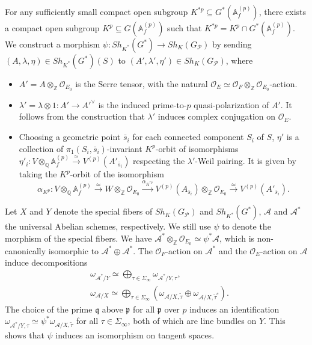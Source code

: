 \documentclass{article}
\begin{document}
For any sufficiently small compact open subgroup $K^{\ast p}\subseteq G^\ast(\mathbb{A}_f^{(p)})$, there exists a compact open subgroup $K^p\subseteq G(\mathbb{A}_f^{(p)})$ such that $K^{\ast p}=K^p\cap G^\ast(\mathbb{A}_f^{(p)})$. We construct a morphism $\psi:Sh_{K^\ast}(G^\ast)\longrightarrow Sh_K(G_{\mathcal{P}})$ by sending $(A,\lambda,\eta)\in Sh_{K^\ast}(G^\ast)(S)$ to $(A',\lambda',\eta')\in Sh_K(G_{\mathcal{P}})$, where
\begin{itemize}
	\item $A'=A\otimes_{\mathbb{Z}}\mathcal{O}_{E_0}$ is the Serre tensor, with the natural $\mathcal{O}_E\simeq \mathcal{O}_F\otimes_{\mathbb{Z}}\mathcal{O}_{E_0}$-action.
	\item $\lambda'=\lambda\otimes 1:A'\to A'^\vee$ is the induced prime-to-$p$ quasi-polarization of $A'$. It follows from the construction that $\lambda'$ induces complex conjugation on $\mathcal{O}_E$.
	\item Choosing a geometric point $\bar{s}_i$ for each connected component $S_i$ of $S$, $\eta'$ is a collection of $\pi_1(S_i,\bar{s}_i)$-invariant $K^p$-orbit of isomorphisms $\eta'_i:V\otimes_{\mathbb{Q}}\mathbb{A}_f^{(p)}\xrightarrow{\simeq}V^{(p)}(A'_{\bar{s}_i})$ respecting the $\lambda'$-Weil pairing. It is given by taking the $K^p$-orbit of the isomorphism
	\begin{equation}
		\alpha_{K^p}:V\otimes_{\mathbb{Q}}\mathbb{A}_f^{(p)}\xrightarrow{\simeq} W\otimes_{\mathbb{Z}}\mathcal{O}_{E_0}\xrightarrow{\alpha_{K^{\ast p}}}V^{(p)}(A_{\bar{s}_i})\otimes_{\mathbb{Z}}\mathcal{O}_{E_0}\xrightarrow{\simeq} V^{(p)}(A'_{\bar{s}_i}).
	\end{equation}
\end{itemize}

Let $X$ and $Y$ denote the special fibers of $Sh_{K}(G_{\mathcal{P}})$ and $Sh_{K^\ast}(G^\ast)$,  $\mathcal{A}$ and $\mathcal{A}^\ast$ the universal Abelian schemes, respectively. We still use $\psi$ to denote the morphism of the special fibers. We have $\mathcal{A}^\ast\otimes_{\mathbb{Z}}\mathcal{O}_{E_0}\simeq\psi^\ast\mathcal{A}$, which is non-canonically isomorphic to $\mathcal{A}^\ast\oplus\mathcal{A}^\ast$. The $\mathcal{O}_F$-action on $\mathcal{A}^\ast$ and the $\mathcal{O}_E$-action on $\mathcal{A}$ induce decompositions
\begin{equation}
	\begin{aligned}
		&\omega_{\mathcal{A}^\ast/Y}\simeq\bigoplus_{\tau\in\Sigma_{\infty}} \omega_{\mathcal{A}^\ast/Y,\tau},\\
		&\omega_{\mathcal{A}/X}\simeq\bigoplus_{\tau\in\Sigma_{\infty}} (\omega_{\mathcal{A}/X,\tilde\tau}\oplus \omega_{\mathcal{A}/X,\tilde\tau^c}).
	\end{aligned}
\end{equation}
The choice of the prime $\mathfrak{q}$ above $\mathfrak{p}$ for all $\mathfrak{p}$ over $p$ induces an identification $\omega_{\mathcal{A}^\ast/Y,\tau}\simeq \psi^\ast\omega_{\mathcal{A}/X,\tilde\tau}$ for all $\tau\in\Sigma_{\infty}$, both of which are line bundles on $Y$. This shows that $\psi$ induces an isomorphism on tangent spaces.
\end{document}
